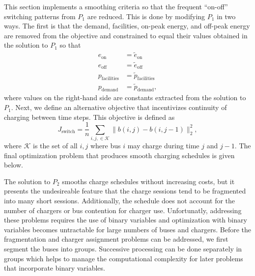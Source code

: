 \par This section implements a smoothing criteria so that the frequent ``on-off'' switching patterns from $P_1$ are reduced. This is done by modifying $P_1$ in two ways. The first is that the demand, facilities, on-peak energy, and off-peak energy are removed from the objective and constrained to equal their values obtained in the solution to $P_1$ so that
\begin{equation}\label{eqn:unconstrainedSmooth:equivalence}\begin{aligned}
	e_{\text{on}} &= \tilde{e}_{\text{on}} \\
	e_{\text{off}} &= \tilde{e}_{\text{off}} \\
	p_{\text{facilities}} &= \tilde{p}_{\text{facilities}} \\
	p_{\text{demand}} &= \tilde{p}_{\text{demand}},
\end{aligned}\end{equation}
where values on the right-hand side are constants extracted from the solution to $P_1$.
Next, we define an alternative objective that incentivizes continuity of charging between time steps. This objective is defined as
\begin{equation}\label{eqn:objective:smooth}
	J_{\text{switch}} = \frac{1}{n}\sum_{i,j, \in \mathcal{K}}\lVert b(i,j) - b(i,j-1) \rVert^2_2,
\end{equation}
where $\mathcal{K}$ is the set of all $i,j$ where bus $i$ may charge during time $j$ and $j - 1$.  The final optimization problem that produces smooth charging schedules is given below.\\[0.1in]

\par The solution to $P_2$ smooths charge schedules without increasing costs, but it presents the undesireable feature that the charge sessions tend to be fragmented into many short sessions. Additionally, the schedule does not account for the number of chargers or bus contention for charger use. Unfortunatly, addressing these problems requires the use of binary variables and optimization with binary variables becomes untractable for large numbers of buses and chargers. Before the fragmentation and charger assignment problems can be addressed, we first segment the buses into groups.  Successive processing can be done separately in groups which helps to manage the computational complexity for later problems that incorporate binary variables.
